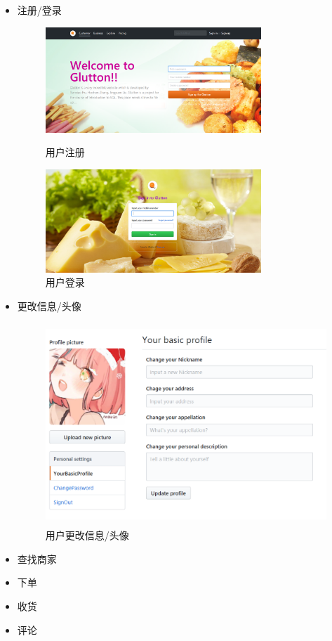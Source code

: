 \documentclass[12pt, oneside,a4paper]{article}
\begin{document}
  \begin{itemize}
  \item 注册/登录
  \begin{figure}[H]
   \begin{minipage}[t]{0.5\linewidth}
    \centering
     \includegraphics[width=3.2in]{signup.png}
     \caption{\small{用户注册}}\label{fig:dummy}
   \end{minipage}
   \begin{minipage}[t]{0.5\linewidth}
    \centering
     \includegraphics[width=3.2in]{signin.png}
      \caption{\small{用户登录}}\label{fig:dummy}
   \end{minipage}
   \end{figure}
  \item 更改信息/头像
  \begin{figure}[H]
   \centering
     \includegraphics[width=5.00in,height=3.00in]{customer-profile.png}
     \caption{\small{用户更改信息/头像}}\label{fig:dummy}
  \end{figure}
  \item 查找商家
  \item 下单
  \item 收货
  \item 评论
  \end{itemize}
\end{document}
